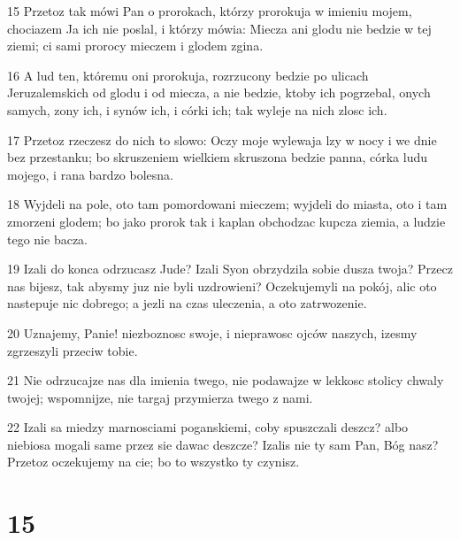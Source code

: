 \par 15 Przetoz tak mówi Pan o prorokach, którzy prorokuja w imieniu mojem, chociazem Ja ich nie poslal, i którzy mówia: Miecza ani glodu nie bedzie w tej ziemi; ci sami prorocy mieczem i glodem zgina.
\par 16 A lud ten, któremu oni prorokuja, rozrzucony bedzie po ulicach Jeruzalemskich od glodu i od miecza, a nie bedzie, ktoby ich pogrzebal, onych samych, zony ich, i synów ich, i córki ich; tak wyleje na nich zlosc ich.
\par 17 Przetoz rzeczesz do nich to slowo: Oczy moje wylewaja lzy w nocy i we dnie bez przestanku; bo skruszeniem wielkiem skruszona bedzie panna, córka ludu mojego, i rana bardzo bolesna.
\par 18 Wyjdeli na pole, oto tam pomordowani mieczem; wyjdeli do miasta, oto i tam zmorzeni glodem; bo jako prorok tak i kaplan obchodzac kupcza ziemia, a ludzie tego nie bacza.
\par 19 Izali do konca odrzucasz Jude? Izali Syon obrzydzila sobie dusza twoja? Przecz nas bijesz, tak abysmy juz nie byli uzdrowieni? Oczekujemyli na pokój, alic oto nastepuje nic dobrego; a jezli na czas uleczenia, a oto zatrwozenie.
\par 20 Uznajemy, Panie! niezboznosc swoje, i nieprawosc ojców naszych, izesmy zgrzeszyli przeciw tobie.
\par 21 Nie odrzucajze nas dla imienia twego, nie podawajze w lekkosc stolicy chwaly twojej; wspomnijze, nie targaj przymierza twego z nami.
\par 22 Izali sa miedzy marnosciami poganskiemi, coby spuszczali deszcz? albo niebiosa mogali same przez sie dawac deszcze? Izalis nie ty sam Pan, Bóg nasz? Przetoz oczekujemy na cie; bo to wszystko ty czynisz.

\chapter{15}

